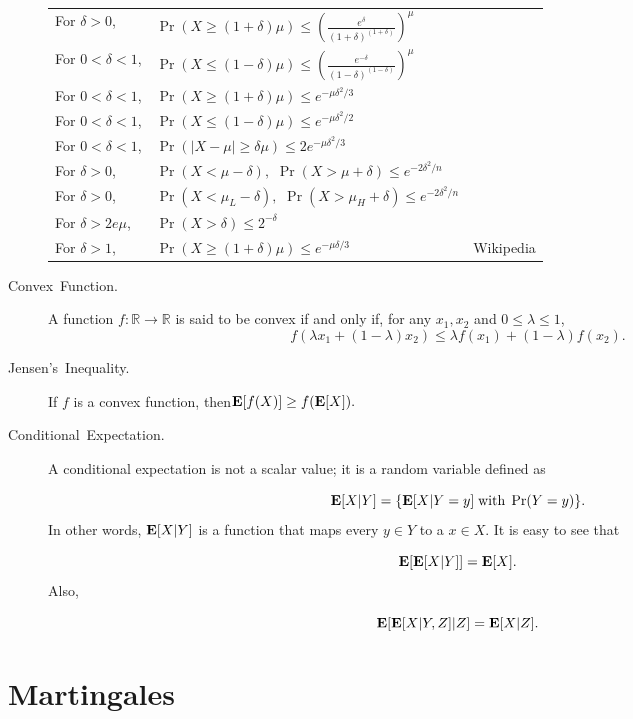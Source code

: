 \documentclass[11pt]{article}
\theoremstyle{mytheoremstyle}
\begin{document}
\begin{description}
	\begin{center}
		\begin{tabular}{lll}
			For $\delta>0$, & $\Pr(X\geq(1+\delta)\mu)\leq\left(\frac{e^{\delta}}{(1+\delta)^{(1+\delta)}}\right)^{\mu}$\bigskip{}
			& \cite[Page 64]{Michael2005}\tabularnewline
			For $0<\delta<1$, & $\Pr(X\leq(1-\delta)\mu)\leq\left(\frac{e^{-\delta}}{(1-\delta)^{(1-\delta)}}\right)^{\mu}$\bigskip{}
			& \cite[Page 66]{Michael2005}\tabularnewline
			For $0<\delta<1$, & $\Pr(X\geq(1+\delta)\mu)\leq e^{-\mu\delta^{2}/3}$\bigskip{}
			& \cite[Page 64]{Michael2005}\tabularnewline
			For $0<\delta<1$, & $\Pr(X\leq(1-\delta)\mu)\leq e^{-\mu\delta^{2}/2}$\bigskip{}
			& \cite[Page 66]{Michael2005}\tabularnewline
			For $0<\delta<1$, & $\Pr(|X-\mu|\geq\delta\mu)\leq2e^{-\mu\delta^{2}/3}$\bigskip{}
			& \cite[Page 67]{Michael2005}\tabularnewline
			For $\delta>0$, & $\Pr(X<\mu-\delta),\,\,\Pr(X>\mu+\delta)\leq e^{-2\delta^{2}/n}$\bigskip{}
			& \cite[Page 6]{dubhashi:2009}\tabularnewline
			For $\delta>0$, & $\Pr(X<\mu_{L}-\delta),\,\,\Pr(X>\mu_{H}+\delta)\leq e^{-2\delta^{2}/n}$\bigskip{}
			& \cite[Page 8]{dubhashi:2009}\tabularnewline
			For $\delta>2e\mu$, & $\Pr(X>\delta)\leq2^{-\delta}$\bigskip{}
			& \cite[Page 7]{dubhashi:2009}\tabularnewline
			For $\delta>1$, & $\Pr(X\geq(1+\delta)\mu)\leq e^{-\mu\delta/3}$ & Wikipedia\tabularnewline
		\end{tabular}
		\par\end{center}
	\item [{Convex~Function.}] A function $f:\mathbb{R\to\mathbb{R}}$ is
	said to be convex if and only if, for any $x_{1},x_{2}$ and $0\leq\lambda\leq1$,
	\[
	f(\lambda x_{1}+(1-\lambda)x_{2})\leq\lambda f(x_{1})+(1-\lambda)f(x_{2}).
	\]
	\item [{Jensen's~Inequality.}] If $f$ is a convex function, then\enspace{}$\mathrm{\mathbf{E}}[f(X)]\geq f(\mathrm{\mathbf{E}}[X]).$
	\item [{Conditional~Expectation.}] A conditional expectation is not a
	scalar value; it is a random variable defined as
	
	\[
	\mathrm{\mathbf{E}}[X|Y]=\{\mathrm{\mathbf{E}}[X|Y=y]\;\text{with}\;\Pr(Y=y)\}.
	\]
	In other words, $\mathrm{\mathbf{E}}[X|Y]$ is a function that maps every $y\in Y$
	to a $x\in X$. It is easy to see that
	
	\[
	\mathrm{\mathbf{E}}[\mathrm{\mathbf{E}}[X|Y]]=\mathrm{\mathbf{E}}[X].
	\]
	Also,
	
	\[
	\mathrm{\mathbf{E}}[\mathrm{\mathbf{E}}[X|Y,Z]|Z]=\mathrm{\mathbf{E}}[X|Z].
	\]
	
\end{description}

\section*{Martingales}
\end{document}
